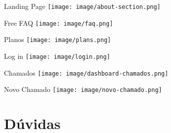 \documentclass[%
    english,
    brazil]{ifsp-spo-beamer}
\begin{document}
\begin{frame}{Landing Page} 
    \texttt{[image: image/about-section.png]}
\end{frame}

\begin{frame}{Free FAQ} 
    \texttt{[image: image/faq.png]}
\end{frame}

\begin{frame}{Planos} 
    \texttt{[image: image/plans.png]}
\end{frame}

\begin{frame}{Log in} 
    \texttt{[image: image/login.png]}
\end{frame}

\begin{frame}{Chamados} 
    \texttt{[image: image/dashboard-chamados.png]}
\end{frame}

\begin{frame}{Novo Chamado} 
    \texttt{[image: image/novo-chamado.png]}
\end{frame}

\section*{Dúvidas}
\end{document}
